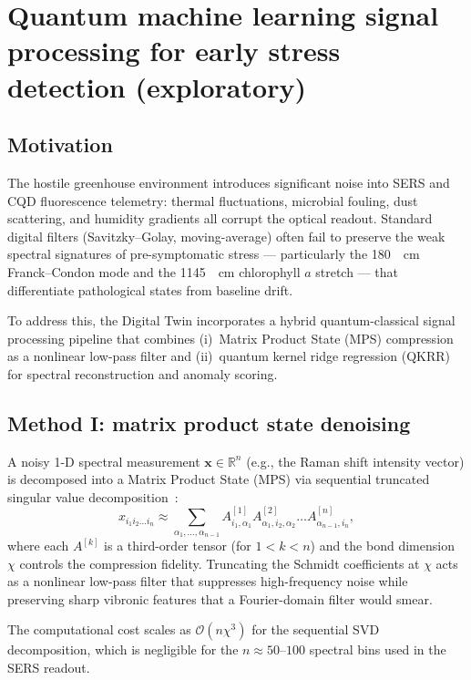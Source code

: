 \documentclass[11pt,a4paper]{article}
\begin{document}
\section{Quantum machine learning signal processing for early stress detection (exploratory)}
\label{SI-sec:qml}

\subsection{Motivation}

The hostile greenhouse environment introduces significant noise into SERS and CQD fluorescence telemetry: thermal fluctuations, microbial fouling, dust scattering, and humidity gradients all corrupt the optical readout. Standard digital filters (Savitzky--Golay, moving-average) often fail to preserve the weak spectral signatures of pre-symptomatic stress --- particularly the \qty{180}{\per\cm} Franck--Condon mode and the \qty{1145}{\per\cm} chlorophyll $a$  stretch --- that differentiate pathological states from baseline drift.

To address this, the Digital Twin incorporates a hybrid quantum-classical signal processing pipeline that combines (i)~Matrix Product State (MPS) compression as a nonlinear low-pass filter and (ii)~quantum kernel ridge regression (QKRR) for spectral reconstruction and anomaly scoring.

\subsection{Method I: matrix product state denoising}

A noisy 1-D spectral measurement $\mathbf{x} \in \mathbb{R}^n$ (e.g., the Raman shift intensity vector) is decomposed into a Matrix Product State (MPS) via sequential truncated singular value decomposition~\cite{Stoudenmire2016}:
\begin{equation}\label{eq:SI_mps_decomp}
x_{i_1 i_2 \dots i_n} \approx \sum_{\alpha_1,\dots,\alpha_{n-1}} A^{[1]}_{i_1,\alpha_1} A^{[2]}_{\alpha_1,i_2,\alpha_2} \dots A^{[n]}_{\alpha_{n-1},i_n},
\end{equation}
where each $A^{[k]}$ is a third-order tensor (for $1<k<n$) and the bond dimension $\chi$ controls the compression fidelity. Truncating the Schmidt coefficients at $\chi$ acts as a nonlinear low-pass filter that suppresses high-frequency noise while preserving sharp vibronic features that a Fourier-domain filter would smear.

The computational cost scales as $\mathcal{O}(n \chi^3)$ for the sequential SVD decomposition, which is negligible for the $n \approx 50$--$100$ spectral bins used in the SERS readout.
\end{document}

